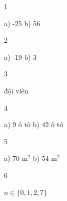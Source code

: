 \begin{Solbook}{1}
 \par \noindent a) -25 \hfill b) 56  \hfill \qedEX 
\end{Solbook}
\begin{Solbook}{2}
 \par \noindent a) -19 \hfill b) 3 \hfill \qedEX 
\end{Solbook}
\begin{Solbook}{3}
 \par {} đội viên \hfill \qedEX 
\end{Solbook}
\begin{Solbook}{4}
 \par \noindent a) $9$ ô tô \hfill b) $42$ ô tô  \hfill \qedEX 
\end{Solbook}
\begin{Solbook}{5}
 \par \noindent a) $70 \text { m}^2$ \hfill b) $54 \text { m}^2$  \hfill \qedEX 
\end{Solbook}
\begin{Solbook}{6}
 \par \noindent $n\in \{0, 1, 2, 7\}$ \hfill \qedEX 
\end{Solbook}

